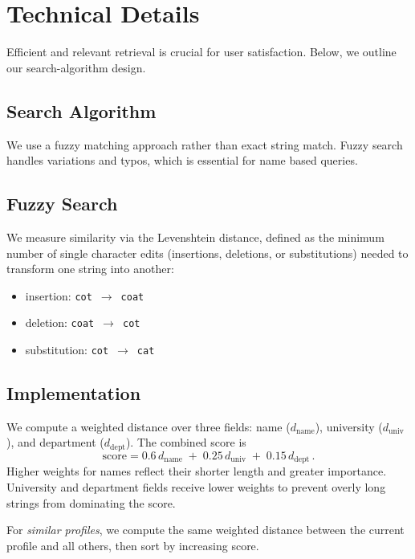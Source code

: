 \section{Technical Details}

Efficient and relevant retrieval is crucial for user satisfaction. Below, we outline our search-algorithm design.

\subsection{Search Algorithm}

We use a fuzzy matching approach rather than exact string match. Fuzzy search handles variations and typos, which is essential for name based queries.

\subsection{Fuzzy Search}

We measure similarity via the Levenshtein distance, defined as the minimum number of single character edits (insertions, deletions, or substitutions) needed to transform one string into another:
\begin{itemize}
    \item insertion: \texttt{cot}~$\to$~\texttt{coat}
    \item deletion: \texttt{coat}~$\to$~\texttt{cot}
    \item substitution: \texttt{cot}~$\to$~\texttt{cat}
\end{itemize}

\subsection{Implementation}

We compute a weighted distance over three fields: name ($d_{\mathrm{name}}$), university ($d_{\mathrm{univ}}$), and department ($d_{\mathrm{dept}}$). The combined score is
\[
  \text{score} = 0.6\,d_{\mathrm{name}} \;+\; 0.25\,d_{\mathrm{univ}} \;+\; 0.15\,d_{\mathrm{dept}}\,.
\]
Higher weights for names reflect their shorter length and greater importance. University and department fields receive lower weights to prevent overly long strings from dominating the score.

For \emph{similar profiles}, we compute the same weighted distance between the current profile and all others, then sort by increasing score.